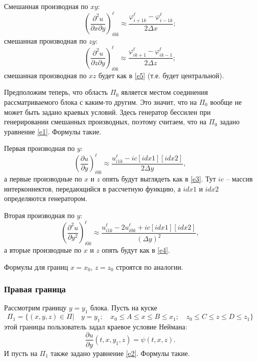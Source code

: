\documentclass[a4paper]{article}
\begin{document}
Смешанная производная по $xy$:
\begin{equation}\label{e7}
\left(\frac{\partial^2 u}{\partial x\partial y}\right)^{\ell}_{i0k} \approx \frac{\varphi^{\ell}_{i+1k} - \varphi^{\ell}_{i-1k}}{2\Delta x};
\end{equation}
смешанная производная по $zy$:
\begin{equation}\label{e8}
\left(\frac{\partial^2 u}{\partial z\partial y}\right)^{\ell}_{i0k} \approx \frac{\varphi^{\ell}_{ik+1} - \varphi^{\ell}_{ik-1}}{2\Delta z};
\end{equation}
смешанная производная по $xz$ будет как в \eqref{e5} (т.е. будет центральной).

Предположим теперь, что область $\Pi_0$ является местом соединения рассматриваемого блока с каким-то другим. Это значит, что на $\Pi_0$ вообще не может быть задано краевых условий. Здесь генератор бессилен при генерировании смешанных производных, поэтому считаем, что на $\Pi_0$ задано уравнение \eqref{e1}. Формулы такие.

Первая производная по $y$:
\begin{equation*}
\left(\frac{\partial u}{\partial y}\right)^{\ell}_{i0k} \approx \frac{u^{\ell}_{i1k} - ic[idx1][idx2]}{2\Delta y},
\end{equation*}
а первые производные по $x$ и $z$ опять будут выглядеть как в \eqref{e3}. Тут $ic$ -- массив интерконнектов, передающийся в рассчетную функцию, а $idx1$ и $idx2$ определяются генератором.

Вторая производная по $y$:
\begin{equation*}
\left(\frac{\partial^2 u}{\partial y^2}\right)^{\ell}_{i0k} \approx \frac{u^{\ell}_{i1k} - 2u^{\ell}_{i0k} +  ic[idx1][idx2]}{(\Delta y)^2},
\end{equation*}
а вторые производные по $x$ и $z$ опять будут как в \eqref{e4}.

Формулы для границ $x = x_0$, $z = z_0$ строятся по аналогии.

\subsubsection{\large Правая граница}
Рассмотрим границу $y = y_1$ блока. Пусть на куске \[\Pi_1 = \{(x,y,z) \in \Pi|\quad y = y_1;\quad x_0 \leqslant A \leqslant x \leqslant B \leqslant x_1;\quad z_0 \leqslant C \leqslant z \leqslant D \leqslant z_1\}\] этой границы пользователь задал краевое условие Неймана:
\begin{equation*}
\frac{\partial u}{\partial y}(t,x,y_1,z) = \psi(t,x,z).
\end{equation*}
И пусть на $\Pi_1$ также задано уравнение \eqref{e2}. Формулы такие.
\end{document}
